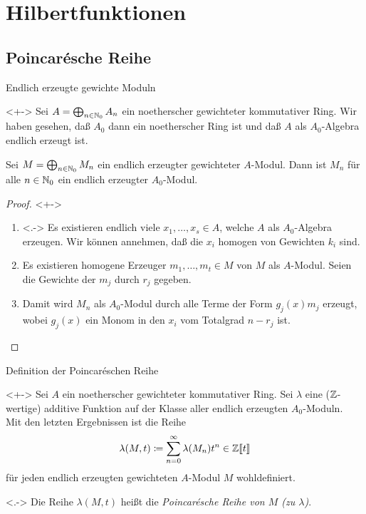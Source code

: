 \section{Hilbertfunktionen}

\subsection{Poincarésche Reihe}

\begin{frame}{Endlich erzeugte gewichte Moduln}
	\begin{visibleenv}<+->
		Sei \(A = \bigoplus_{n \in \mathbb N_0} A_n\) ein noetherscher gewichteter kommutativer Ring. Wir haben
		gesehen, daß \(A_0\) dann ein noetherscher Ring ist und daß \(A\) als
		\(A_0\)-Algebra endlich erzeugt ist.
	\end{visibleenv}
	\begin{proposition}
		Sei
		\(M = \bigoplus_{n \in \mathbb N_0} M_n\) ein endlich erzeugter gewichteter \(A\)-Modul. Dann ist
		\(M_n\) für alle \(n \in \mathbb N_0\) ein endlich erzeugter \(A_0\)-Modul.
	\end{proposition}
	\begin{proof}<+->
		\begin{enumerate}[<+->]
		\item<.->
			Es existieren endlich
			viele \(x_1, \dotsc, x_s \in A\), welche \(A\) als
			\(A_0\)-Algebra erzeugen. Wir können annehmen, daß die \(x_i\)
			homogen von Gewichten \(k_i\) sind.
		\item
			Es existieren homogene Erzeuger \(m_1, \dotsc, m_t \in M\) von \(M\) als
			\(A\)-Modul. Seien die Gewichte der \(m_j\) durch \(r_j\) gegeben.
		\item
			Damit wird  \(M_n\) als \(A_0\)-Modul durch alle Terme der Form
			\(g_j(x) m_j\) erzeugt, wobei \(g_j(x)\) ein Monom in den \(x_i\) vom
			Totalgrad \(n - r_j\) ist.
			\qedhere
		\end{enumerate}
	\end{proof}
\end{frame}

\begin{frame}{Definition der Poincaréschen Reihe}
	\begin{visibleenv}<+->
		Sei \(A\) ein noetherscher gewichteter kommutativer Ring. Sei
		\(\lambda\) eine (\(\mathbb Z\)-wertige) additive Funktion auf der Klasse
		aller endlich erzeugten \(A_0\)-Moduln.
		\\
		Mit den letzten Ergebnissen ist die Reihe
		\[
			\lambda(M, t) \coloneqq \sum\limits_{n = 0}^\infty \lambda(M_n) t^n
			\in \mathbb Z\llbracket t\rrbracket
		\]
		für jeden endlich erzeugten gewichteten \(A\)-Modul \(M\)
		wohldefiniert.
	\end{visibleenv}
	\begin{definition}<.->
		Die Reihe \(\lambda(M, t)\) heißt die \emph{Poincarésche Reihe
		von \(M\) (zu \(\lambda\))}.
	\end{definition}
\end{frame}

